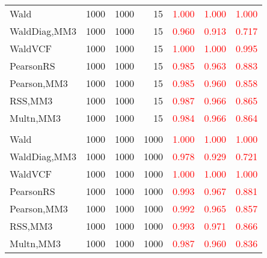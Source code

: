 \documentclass[
]{article}
\begin{document}
\begin{table}[H]
{\begin{tabular}[t]{lrrrrrr}
\hspace{1em}Wald & 1000 & 1000 & 15 & \textcolor{red}{1.000} & \textcolor{red}{1.000} & \textcolor{red}{1.000}\\
\hspace{1em}WaldDiag,MM3 & 1000 & 1000 & 15 & \textcolor{red}{0.960} & \textcolor{red}{0.913} & \textcolor{red}{0.717}\\
\hspace{1em}WaldVCF & 1000 & 1000 & 15 & \textcolor{red}{1.000} & \textcolor{red}{1.000} & \textcolor{red}{0.995}\\
\hspace{1em}PearsonRS & 1000 & 1000 & 15 & \textcolor{red}{0.985} & \textcolor{red}{0.963} & \textcolor{red}{0.883}\\
\hspace{1em}Pearson,MM3 & 1000 & 1000 & 15 & \textcolor{red}{0.985} & \textcolor{red}{0.960} & \textcolor{red}{0.858}\\
\hspace{1em}RSS,MM3 & 1000 & 1000 & 15 & \textcolor{red}{0.987} & \textcolor{red}{0.966} & \textcolor{red}{0.865}\\
\hspace{1em}Multn,MM3 & 1000 & 1000 & 15 & \textcolor{red}{0.984} & \textcolor{red}{0.966} & \textcolor{red}{0.864}\\
\addlinespace[0.3em]
\multicolumn{7}{l}{\textbf{3F 15V}}\\
\hspace{1em}Wald & 1000 & 1000 & 1000 & \textcolor{red}{1.000} & \textcolor{red}{1.000} & \textcolor{red}{1.000}\\
\hspace{1em}WaldDiag,MM3 & 1000 & 1000 & 1000 & \textcolor{red}{0.978} & \textcolor{red}{0.929} & \textcolor{red}{0.721}\\
\hspace{1em}WaldVCF & 1000 & 1000 & 1000 & \textcolor{red}{1.000} & \textcolor{red}{1.000} & \textcolor{red}{1.000}\\
\hspace{1em}PearsonRS & 1000 & 1000 & 1000 & \textcolor{red}{0.993} & \textcolor{red}{0.967} & \textcolor{red}{0.881}\\
\hspace{1em}Pearson,MM3 & 1000 & 1000 & 1000 & \textcolor{red}{0.992} & \textcolor{red}{0.965} & \textcolor{red}{0.857}\\
\hspace{1em}RSS,MM3 & 1000 & 1000 & 1000 & \textcolor{red}{0.993} & \textcolor{red}{0.971} & \textcolor{red}{0.866}\\
\hspace{1em}Multn,MM3 & 1000 & 1000 & 1000 & \textcolor{red}{0.987} & \textcolor{red}{0.960} & \textcolor{red}{0.836}\\
\bottomrule
\end{tabular}}
\endgroup{}
\end{table}
\end{document}
